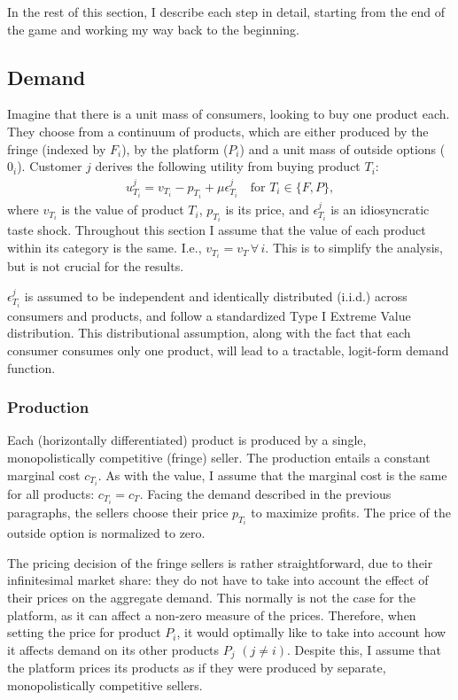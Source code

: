 \documentclass[a4paper]{article}
\begin{document}
In the rest of this section, I describe each step in detail, starting from the end of the game and working my way back to the beginning.

\subsection{Demand}
\label{sec:demand}

Imagine that there is a unit mass of consumers, looking to buy one product each.
They choose from a continuum of products, which are either produced by the fringe (indexed by $F_i$), by the platform ($P_i$) and a unit mass of outside options ($0_i$).
Customer $j$ derives the following utility from buying product $T_i$:
\begin{align*}
    u_{T_i}^j = v_{T_i} - p_{T_i} + \mu\epsilon_{T_i}^j \quad \text{for } T_i \in \{F, P\},
\end{align*}
where $v_{T_i}$ is the value of product $T_i$, $p_{T_i}$ is its price, and $\epsilon_{T_i}^j$ is an idiosyncratic taste shock.
Throughout this section I assume that the value of each product within its category is the same.
I.e., $v_{T_i} = v_T \, \forall\,i$.
This is to simplify the analysis, but is not crucial for the results.

$\epsilon_{T_i}^j$ is assumed to be independent and identically distributed (i.i.d.) across consumers and products, and follow a standardized Type I Extreme Value distribution.
This distributional assumption, along with the fact that each consumer consumes only one product, will lead to a tractable, logit-form demand function.

\subsubsection{Production}

Each (horizontally differentiated) product is produced by a single, monopolistically competitive (fringe) seller.
The production entails a constant marginal cost $c_{T_i}$.
As with the value, I assume that the marginal cost is the same for all products: $c_{T_i} = c_T$.
Facing the demand described in the previous paragraphs, the sellers choose their price $p_{T_i}$ to maximize profits.
The price of the outside option is normalized to zero.

The pricing decision of the fringe sellers is rather straightforward, due to their infinitesimal market share: they do not have to take into account the effect of their prices on the aggregate demand.
This normally is not the case for the platform, as it can affect a non-zero measure of the prices.
Therefore, when setting the price for product $P_i$, it would optimally like to take into account how it affects demand on its other products $P_j$ $(j \neq i)$.
Despite this, I assume that the platform prices its products as if they were produced by separate, monopolistically competitive sellers.
\end{document}
